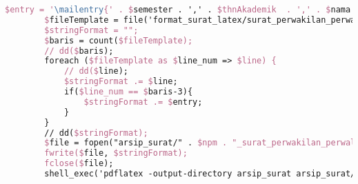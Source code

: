\begin{lstlisting}[language=tex,basicstyle=\tiny,caption=HistorysuratController.php]
        $entry = '\mailentry{' . $semester . ',' . $thnAkademik  . ',' . $nama . ',' . $prodi . ',' . $npm . ',' . $namaWakil . ',' . $prodiWakil . ',' . $npmWakil . ',' . $dosenWali . ',' . $alasan . ',' . $kodeMK1 . ',' . $matkul1 . ',' . $sks1 . ',' . $kodeMK2 . ',' . $matkul2 . ',' . $sks2 . ',' . $kodeMK3 . ',' . $matkul3 . ',' . $sks3 . ',' . $kodeMK4 . ',' . $matkul4 . ',' . $sks4 . ',' . $kodeMK5 . ',' . $matkul5 . ',' . $sks5 . ',' . $tanggal . '}';
        $fileTemplate = file('format_surat_latex/surat_perwakilan_perwalian_5mk.tex');
        $stringFormat = "";
        $baris = count($fileTemplate);
        // dd($baris);
        foreach ($fileTemplate as $line_num => $line) {
            // dd($line);
            $stringFormat .= $line;
            if($line_num == $baris-3){
                $stringFormat .= $entry;
            }
        }
        // dd($stringFormat);
        $file = fopen("arsip_surat/" . $npm . "_surat_perwakilan_perwalian_5mk.tex", "w");
        fwrite($file, $stringFormat);
        fclose($file);
        shell_exec('pdflatex -output-directory arsip_surat arsip_surat/' . $npm . '_surat_perwakilan_perwalian_5mk.tex');


\end{lstlisting}
